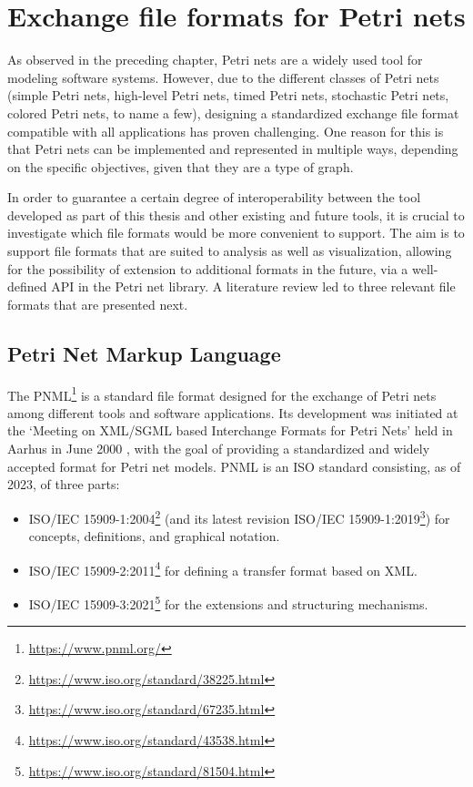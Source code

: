 \section{Exchange file formats for Petri nets}

As observed in the preceding chapter,
Petri nets are a widely used tool for modeling software systems.
However, due to the different classes of Petri nets
(simple Petri nets, high-level Petri nets, timed Petri nets,
stochastic Petri nets, colored Petri nets, to name a few),
designing a standardized exchange file format
compatible with all applications has proven challenging.
One reason for this is that
Petri nets can be implemented and represented in multiple ways,
depending on the specific objectives, given that they are a type of graph.

In order to guarantee a certain degree of interoperability between the tool developed
as part of this thesis and other existing and future tools, it is crucial
to investigate which file formats would be more convenient to support.
The aim is to support file formats that are suited to analysis as well as visualization,
allowing for the possibility of extension to additional formats in the future,
via a well-defined API in the Petri net library.
A literature review led to three relevant file formats that are presented next.

\subsection{Petri Net Markup Language}

The \acrfull{PNML}\footnote{\url{https://www.pnml.org/}}
is a standard file format designed
for the exchange of Petri nets
among different tools and software applications.
Its development was initiated
at the `Meeting on XML/SGML based Interchange Formats for Petri Nets'
held in Aarhus in June 2000 \cite{jungel2000petri},
with the goal of providing
a standardized and widely accepted format for Petri net models.
PNML is an ISO standard consisting, as of 2023, of three parts:

\begin{itemize}
      \item ISO/IEC 15909-1:2004\footnote{\url{https://www.iso.org/standard/38225.html}}
            (and its latest revision ISO/IEC 15909-1:2019\footnote{\url{https://www.iso.org/standard/67235.html}})
            for concepts, definitions, and graphical notation.
      \item ISO/IEC 15909-2:2011\footnote{\url{https://www.iso.org/standard/43538.html}}
            for defining a transfer format based on XML.
      \item ISO/IEC 15909-3:2021\footnote{\url{https://www.iso.org/standard/81504.html}}
            for the extensions and structuring mechanisms.
\end{itemize}

